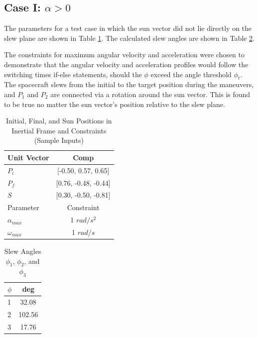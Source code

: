 \documentclass[letterpaper, preprint, paper,11pt]{AAS}	%
\begin{document}
	\subsection{Case I: $\alpha > 0$} 
		
		The parameters for a test case in which the sun vector did not lie directly on the slew plane are shown in Table \ref{tab:alphaNot0_PiPfS_AWmax}. The calculated slew angles are shown in Table \ref{tab:alphaNot0_phi_123}. 
		
		The constraints for maximum angular velocity and acceleration were chosen to demonstrate that the angular velocity and acceleration profiles would follow the switching times if-else statements, should the $\phi$ exceed the angle threshold $\phi_{t}$. The spacecraft slews from the initial to the target position during the maneuvers, and $P_1$ and $P_2$ are connected via a rotation around the sun vector. This is found to be true no matter the sun vector's position relative to the slew plane. 
		
		
		
		\begin{multicols}{2}
			\begin{table}[H]
				\centering
				\caption{Initial, Final, and Sun Positions in Inertial Frame and Constraints (Sample Inputs)}
				\begin{tabular}{lc}
					\toprule
					\midrule
					Unit Vector & Comp \\
					\midrule
					$P_i$ & [-0.50, 0.57, 0.65] \\
					$P_f$ & [0.76, -0.48, -0.44] \\ 
					$S$ & [0.30, -0.50, -0.81] \\
					\midrule
					\midrule
					Parameter & Constraint \\ 
					\midrule
					$\alpha_{max}$ & 1 $rad/s^2$ \\
					$\omega_{max}$ & 1 $rad/s$ \\ 
					\midrule
					\bottomrule
				\end{tabular}%
				\label{tab:alphaNot0_PiPfS_AWmax}%
			\end{table}
			\columnbreak
			\begin{table}[H]
				\centering
				\caption{Slew Angles $\phi_1$, $\phi_2$, and $\phi_3$}
				\begin{tabular}{lc}
					\toprule
					\midrule
					$\phi$ & deg \\
					\midrule
					1 & 32.08 \\
					2 & 102.56 \\ 
					3 & 17.76 \\
					\midrule
					\bottomrule
				\end{tabular}%
				\label{tab:alphaNot0_phi_123}%
			\end{table}%
		\end{multicols}
		
\end{document}
